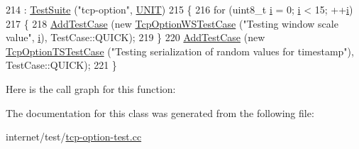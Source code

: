 \begin{DoxyCode}
214     : \hyperlink{classns3_1_1TestSuite_a904b0c40583b744d30908aeb94636d1a}{TestSuite} (\textcolor{stringliteral}{"tcp-option"}, \hyperlink{classns3_1_1TestSuite_a1ebfcab34ec8161e085e8e3a1855eae0a3885375a3787abf60431f8454b3cadbd}{UNIT})
215   \{
216     \textcolor{keywordflow}{for} (uint8\_t \hyperlink{bernuolliDistribution_8m_a6f6ccfcf58b31cb6412107d9d5281426}{i} = 0; \hyperlink{bernuolliDistribution_8m_a6f6ccfcf58b31cb6412107d9d5281426}{i} < 15; ++\hyperlink{bernuolliDistribution_8m_a6f6ccfcf58b31cb6412107d9d5281426}{i})
217       \{
218         \hyperlink{classns3_1_1TestCase_a3718088e3eefd5d6454569d2e0ddd835}{AddTestCase} (\textcolor{keyword}{new} \hyperlink{classTcpOptionWSTestCase}{TcpOptionWSTestCase} (\textcolor{stringliteral}{"Testing window scale value"}, 
      \hyperlink{bernuolliDistribution_8m_a6f6ccfcf58b31cb6412107d9d5281426}{i}), TestCase::QUICK);
219       \}
220     \hyperlink{classns3_1_1TestCase_a3718088e3eefd5d6454569d2e0ddd835}{AddTestCase} (\textcolor{keyword}{new} \hyperlink{classTcpOptionTSTestCase}{TcpOptionTSTestCase} (\textcolor{stringliteral}{"Testing serialization of random
       values for timestamp"}), TestCase::QUICK);
221   \}
\end{DoxyCode}


Here is the call graph for this function\+:




The documentation for this class was generated from the following file\+:\begin{DoxyCompactItemize}
\item 
internet/test/\hyperlink{tcp-option-test_8cc}{tcp-\/option-\/test.\+cc}\end{DoxyCompactItemize}
